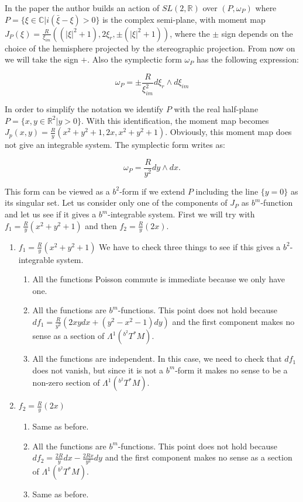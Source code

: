 \begin{example}
In the paper \cite{Marle} the author builds an action of $SL(2,\mathbb{R})$ over $(P,\omega_P)$ where
$P = \{\xi\in \mathbb{C} | i(\bar{\xi} - \xi)>0\}$ is the complex semi-plane, with moment map $J_P(\xi) = \frac{R}{\xi_{im}}((|\xi|^2 + 1),2\xi_r,\pm (|\xi|^2 + 1))$, where the $\pm$ sign depends on the choice of the hemisphere projected by the stereographic projection. From now on we will take the sign $+$. Also the symplectic form $\omega_P$ has the following expression:

$$\omega_P = \pm \frac{R}{\xi_{im}^2} d\xi_r\wedge d\xi_{im}$$

In order to simplify the notation we identify $P$ with the real half-plane $P = \{x,y\in\mathbb{R}^2|y>0\}$. With this identification, the moment map becomes $J_p(x,y)=\frac{R}{y}(x^2 + y^2 + 1, 2x, x^2 + y^2 + 1)$. Obviously, this moment map does not give an integrable system. The symplectic form writes as:

$$\omega_P = \frac{R}{y^2} dy\wedge dx.$$

This form can be viewed as a $b^2$-form if we extend $P$ including the line $\{y=0\}$ as its singular set.
Let us consider only one of the components of $J_P$ as $b^m$-function and let us see if it gives a $b^m$-integrable system. First we will try with $f_1 = \frac{R}{y}(x^2 + y^2 + 1) $ and then $f_2 = \frac{R}{y}(2x)$.
\begin{enumerate}%
\item $f_1 = \frac{R}{y}(x^2 + y^2 + 1)$
We have to check three things to see if this gives a $b^2$-integrable system.
\begin{enumerate}%
\item All the functions Poisson commute is immediate because we only have one.
\item All the functions are $b^m$-functions. This point does not hold because $d f_1= \frac{R}{y^2}(2xydx + (y^2-x^2 - 1)dy)$ and the first component makes no sense as a section of $\Lambda^1 (^{b^2}T^*M)$.
\item All the functions are independent. In this case, we need to check that $df_1$ does not vanish, but since it is not a $b^m$-form it makes no sense  to be a non-zero section of $\Lambda^1 (^{b^2}T^*M)$.
\end{enumerate}
\item $f_2 = \frac{R}{y}(2x)$
\begin{enumerate}

\item Same as before.
\item All the functions are $b^m$-functions. This point does not hold because $d f_2= \frac{2R}{y}dx - \frac{2Rx}{y^2}dy$ and the first component makes no sense as a section of $\Lambda^1 (^{b^2}T^*M)$.
\item Same as before.
\end{enumerate}
\end{enumerate}

\end{example}



